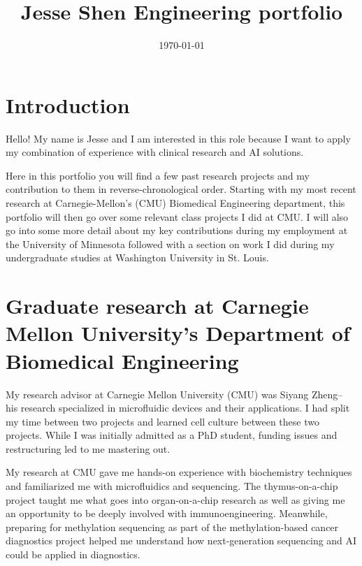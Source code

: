 \documentclass[a4paper,12pt]{article}
\title{Jesse Shen Engineering portfolio}
\date{\today}
\begin{document}

\tableofcontents
\section{Introduction}
Hello! My name is Jesse and I am interested in this role because I want to apply my combination of experience with clinical research and AI solutions. 

Here in this portfolio you will find a few past research projects and my contribution to them in reverse-chronological order. Starting with my most recent research at Carnegie-Mellon's (CMU) Biomedical Engineering department, this portfolio will then go over some relevant class projects I did at CMU. I will also go into some more detail about my key contributions during my employment at the University of Minnesota followed with a section on work I did during my undergraduate studies at Washington University in St. Louis.
\section{Graduate research at Carnegie Mellon University's Department of Biomedical Engineering}
My research advisor at Carnegie Mellon University (CMU) was Siyang Zheng-- his research specialized in microfluidic devices and their applications. I had split my time between two projects and learned cell culture between these two projects. While I was initially admitted as a PhD student, funding issues and restructuring led to me mastering out.

My research at CMU gave me hands-on experience with biochemistry techniques and familiarized me with microfluidics and sequencing. The thymus-on-a-chip project taught me what goes into organ-on-a-chip research as well as giving me an opportunity to be deeply involved with immunoengineering. Meanwhile, preparing for methylation sequencing as part of the methylation-based cancer diagnostics project helped me understand how next-generation sequencing and AI could be applied in diagnostics.
\end{document}
